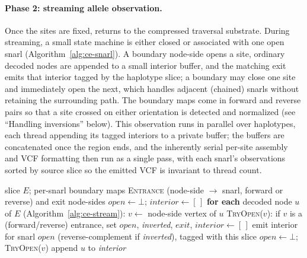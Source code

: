 \paragraph{Phase 2: streaming allele observation.}
Once the sites are fixed, \gfaz returns to the compressed traversal substrate. During
streaming, a small state machine is either closed or associated with one open snarl
(Algorithm~\ref{alg:ce-snarl}). A boundary node-side opens a site, ordinary decoded
nodes are appended to a small interior buffer, and the matching exit emits that
interior tagged by the haplotype slice; a boundary may close one site and immediately
open the next, which handles adjacent (chained) snarls without retaining the
surrounding path. The boundary maps come in forward and reverse pairs so that a site
crossed on either orientation is detected and normalized (see ``Handling
inversions'' below). This observation runs in parallel over haplotypes, each thread
appending its tagged interiors to a private buffer; the buffers are concatenated once
the region ends, and the inherently serial per-site assembly and VCF formatting then
run as a single pass, with each snarl's observations sorted by source slice so the
emitted VCF is invariant to thread count.

\begin{algorithm}[t]
  \caption{Streaming allele observation for one haplotype (snarl mode)}
  \label{alg:ce-snarl}
  \begin{algorithmic}[1]
    \REQUIRE slice $E$; per-snarl boundary maps \textsc{Entrance} (node-side
    $\rightarrow$ snarl, forward or reverse) and exit node-sides
    \STATE $open \gets \bot$; $\textit{interior} \gets [\,]$
    \STATE \textbf{for each} decoded node $u$ of $E$ (Algorithm~\ref{alg:ce-stream}):
    \STATE \quad $v \gets$ node-side vertex of $u$
      \STATE \textsc{TryOpen}($v$): if $v$ is a (forward/reverse) entrance, set
      $open$, \textit{inverted}, $\textit{exit}$, $\textit{interior}\gets[\,]$
      \STATE emit interior for snarl $open$ (reverse-complement if \textit{inverted}),
      tagged with this slice
      \STATE $open \gets \bot$; \textsc{TryOpen}($v$) 
    \ELSE
      \STATE append $u$ to \textit{interior}
    \ENDIF
  \end{algorithmic}
\end{algorithm}

